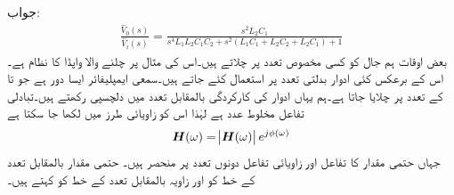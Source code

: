 جواب:
\begin{align*}
\frac{\hat{V}_0(s)}{\hat{V}_i(s)}=\frac{s^2 L_2 C_1}{s^4 L_1 L_2 C_1 C_2 +s^2(L_1 C_1+L_2 C_2+L_2 C_1)+1}
\end{align*}
بعض اوقات ہم جال کو کسی مخصوص تعدد پر چلاتے ہیں۔اس کی مثال  پر چلنے والا واپڈا کا نظام ہے۔اس کے برعکس کئی ادوار بدلتی تعدد پر استعمال کئے جاتے ہیں۔سمعی ایمپلیفائر ایسا دور ہے جو  تا  کے تعدد پر چلایا جاتا ہے۔ہم یہاں ادوار کی کارکردگی بالمقابل تعدد میں دلچسپی رکھتے ہیں۔تبادلی تفاعل مخلوط عدد ہے لہٰذا اس کو زاویائی طرز میں لکھا جا سکتا ہے
\begin{align}
{\ensuremath{{\boldsymbol{H}}}}(\omega)=\abs{{{\boldsymbol{H}}}(\omega)}e^{j\phi(\omega)}
\end{align}
جہاں حتمی مقدار کا تفاعل  اور زاویائی تفاعل  دونوں تعدد پر منحصر ہیں۔ حتمی مقدار بالمقابل تعدد کے خط کو  اور زاویہ بالمقابل تعدد کے خط کو  کہتے ہیں۔ 

